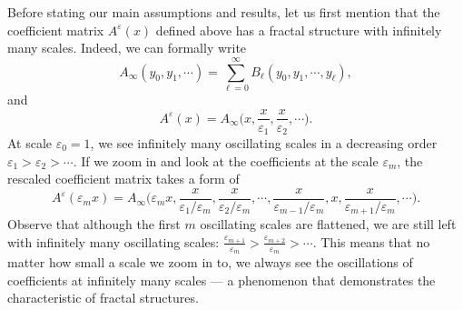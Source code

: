\documentclass[reqno,12pt]{amsart} %
\theoremstyle{definition}
\theoremstyle{remark}
\numberwithin{equation}{section}
\newcommand{\e}{\varepsilon}
\begin{document}
Before stating our main assumptions and results, 
let us first mention that the coefficient matrix $A^\e(x)$ defined above has a fractal structure with infinitely many scales. Indeed, we can formally write %
\begin{equation*}
    A_\infty(y_0, y_1,\cdots) = \sum_{\ell=0}^\infty B_\ell(y_0, y_1, \cdots, y_\ell),
\end{equation*}
and
\begin{equation*}
    A^\e(x) = A_\infty\Big(x,\frac{x}{\e_1}, \frac{x}{\e_2}, \cdots \Big).
\end{equation*}
At scale $\e_0 = 1$, we see infinitely many oscillating scales in a decreasing order $\e_1 > \e_2 > \cdots $. If we zoom in and look at the coefficients at the scale $\e_m$, the rescaled coefficient matrix takes a form of
\begin{equation*}
    A^\e(\e_m x) = A_\infty\Big(\e_m x,\frac{ x}{\e_1/\e_m}, \frac{x}{\e_2/\e_m}, \cdots, \frac{x }{\e_{m-1}/\e_m}, x, \frac{x}{\e_{m+1}/\e_m}, \cdots \Big).
\end{equation*}
Observe that although the first $m$
oscillating scales are flattened, we are still left with infinitely many oscillating scales: 
 $\frac{\e_{m+1}}{\e_{m}} > \frac{\e_{m+2}}{\e_m} > \cdots $. This means that no matter how small a scale we zoom in to, we always see the oscillations of coefficients at infinitely many scales --- a phenomenon that demonstrates the characteristic of fractal structures.
\end{document}
